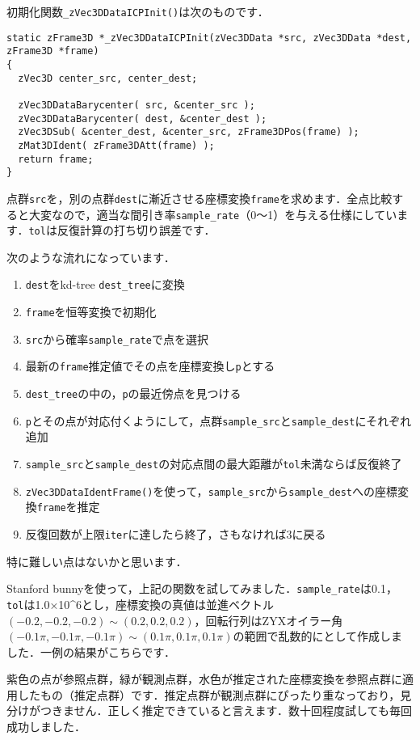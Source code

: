 ﻿\documentclass[a4paper]{jsarticle}
\begin{document}
初期化関数\verb|_zVec3DDataICPInit()|は次のものです．
\begin{screen}
\begin{verbatim}
static zFrame3D *_zVec3DDataICPInit(zVec3DData *src, zVec3DData *dest, zFrame3D *frame)
{
  zVec3D center_src, center_dest;

  zVec3DDataBarycenter( src, &center_src );
  zVec3DDataBarycenter( dest, &center_dest );
  zVec3DSub( &center_dest, &center_src, zFrame3DPos(frame) );
  zMat3DIdent( zFrame3DAtt(frame) );
  return frame;
}
\end{verbatim}
\end{screen}

点群\verb|src|を，別の点群\verb|dest|に漸近させる座標変換\verb|frame|を求めます．全点比較すると大変なので，適当な間引き率\verb|sample_rate|（0〜1）を与える仕様にしています．\verb|tol|は反復計算の打ち切り誤差です．

次のような流れになっています．
\begin{enumerate}
\item \verb|dest|をkd-tree \verb|dest_tree|に変換
\item \verb|frame|を恒等変換で初期化
\item \verb|src|から確率\verb|sample_rate|で点を選択
\item 最新の\verb|frame|推定値でその点を座標変換し\verb|p|とする
\item \verb|dest_tree|の中の，\verb|p|の最近傍点を見つける
\item \verb|p|とその点が対応付くようにして，点群\verb|sample_src|と\verb|sample_dest|にそれぞれ追加
\item \verb|sample_src|と\verb|sample_dest|の対応点間の最大距離が\verb|tol|未満ならば反復終了
\item \verb|zVec3DDataIdentFrame()|を使って，\verb|sample_src|から\verb|sample_dest|への座標変換\verb|frame|を推定
\item 反復回数が上限\verb|iter|に達したら終了，さもなければ3に戻る
\end{enumerate}
特に難しい点はないかと思います．

Stanford bunnyを使って，上記の関数を試してみました．\verb|sample_rate|は0.1，\verb|tol|は1.0×10^6とし，座標変換の真値は並進ベクトル$(-0.2,-0.2,-0.2)\sim(0.2,0.2,0.2)$，回転行列はZYXオイラー角$(-0.1\pi,-0.1\pi,-0.1\pi)\sim(0.1\pi,0.1\pi,0.1\pi)$の範囲で乱数的にとして作成しました．一例の結果がこちらです．


紫色の点が参照点群，緑が観測点群，水色が推定された座標変換を参照点群に適用したもの（推定点群）です．推定点群が観測点群にぴったり重なっており，見分けがつきません．正しく推定できていると言えます．数十回程度試しても毎回成功しました．
\end{document}

